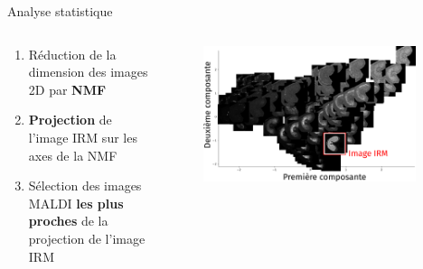 \documentclass[10pt]{beamer}
\begin{document}
\begin{frame}{Analyse statistique}
  
  \begin{columns}
    \begin{column}[t]{0.6\textwidth}
      \begin{enumerate}
      \item Réduction de la dimension des images 2D par \textbf{NMF} 
      \item \textbf{Projection} de l'image IRM sur les axes de la NMF
      \item Sélection des images MALDI \textbf{les plus proches} de la projection
        de l'image IRM 
      \end{enumerate}
    \end{column}
    \begin{column}[t]{0.4\textwidth}
      \begin{figure}[ht]
        \centering
        \includegraphics[width=0.95\textwidth]{fig/pca_big3}
      \end{figure}
    \end{column}
  \end{columns}
\end{frame}
\end{document}
